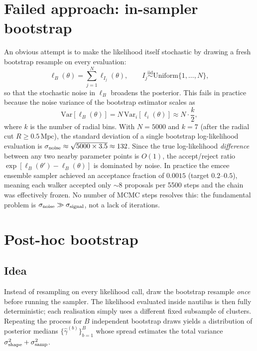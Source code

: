 \documentclass[11pt,a4paper]{article}
\begin{document}
\section{Failed approach: in-sampler bootstrap}

An obvious attempt is to make the likelihood itself stochastic by drawing a
fresh bootstrap resample on every evaluation:
\begin{equation}
  \ell_B(\theta) = \sum_{j=1}^{N} \ell_{I_j}(\theta),
  \qquad I_j \overset{\mathrm{iid}}{\sim} \mathrm{Uniform}\{1,\ldots,N\},
\end{equation}
so that the stochastic noise in $\ell_B$ broadens the posterior.  This fails
in practice because the noise variance of the bootstrap estimator scales as
\begin{equation}
  \mathrm{Var}[\ell_B(\theta)]
  = N\,\mathrm{Var}_i[\ell_i(\theta)]
  \approx N \cdot \frac{k}{2},
\end{equation}
where $k$ is the number of radial bins.  With $N=5000$ and $k=7$
(after the radial cut $R\geq 0.5\,\mathrm{Mpc}$), the standard deviation
of a single bootstrap log-likelihood evaluation is
$\sigma_{\rm noise}\approx\sqrt{5000\times 3.5}\approx 132$.
Since the true log-likelihood \emph{difference} between any two nearby
parameter points is $O(1)$, the accept/reject ratio
$\exp[\ell_B(\theta') - \ell_B(\theta)]$ is dominated by noise.  In
practice the emcee ensemble sampler achieved an acceptance fraction of
$0.0015$ (target $0.2$--$0.5$), meaning each walker accepted only $\sim 8$
proposals per 5500 steps and the chain was effectively frozen.  No number of
MCMC steps resolves this: the fundamental problem is $\sigma_{\rm noise}\gg
\sigma_{\rm signal}$, not a lack of iterations.

\section{Post-hoc bootstrap}

\subsection{Idea}

Instead of resampling on every likelihood call, draw the bootstrap resample
\emph{once} before running the sampler.  The likelihood evaluated inside
nautilus is then fully deterministic; each realisation simply uses a
different fixed subsample of clusters.  Repeating the process for $B$
independent bootstrap draws yields a distribution of posterior medians
$\{\hat\gamma^{(b)}\}_{b=1}^B$ whose spread estimates the total variance
$\sigma_{\rm shape}^2 + \sigma_{\rm samp}^2$.
\end{document}
